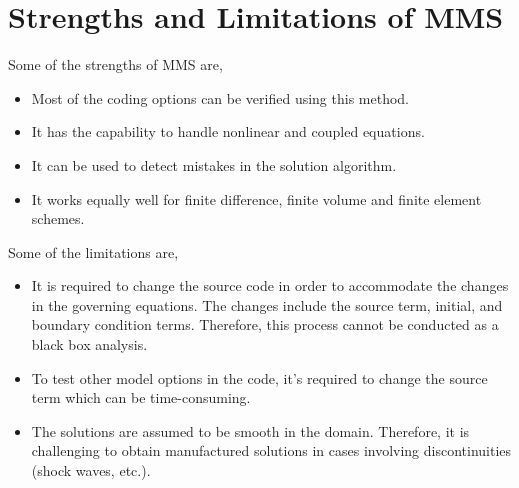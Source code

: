 \section{Strengths and Limitations of MMS}
Some of the strengths of MMS are,\\
\begin{itemize}
  \item Most of the coding options can be verified using this method.
  \item It has the capability to handle nonlinear and coupled equations.
  \item It can be used to detect mistakes in the solution algorithm.
  \item It works equally well for finite difference, finite volume and finite element schemes.
\end{itemize} 
\vspace{0.4cm}
Some of the limitations are,\\
\begin{itemize}
  \item It is required to change the source code in order to accommodate the changes in the governing equations. The changes include the source term, initial, and boundary condition terms. Therefore, this process cannot be conducted as a black box analysis.
  \item To test other model options in the code, it's required to change the source term which can be time-consuming.
  \item The solutions are assumed to be smooth in the domain. Therefore, it is challenging to obtain manufactured solutions in cases involving discontinuities (shock waves, etc.).
\end{itemize}
\begin{comment}
\section{Grid configurations for MMS}
The main objective of using this method in this project is to test the robustness and accuracy of the numerical scheme with different mesh qualities. To achieve this, a set of systematically refined grids are generated and  in each case, the code will be tested. This test is further conducted for several grid configurations which involve skewness, non-orthogonality, and curvature (see figure ). 
\subsection{Non-orthogonality}
\subsection{Grid skewness}

\section{Observed order of accuracy}
\end{comment}



